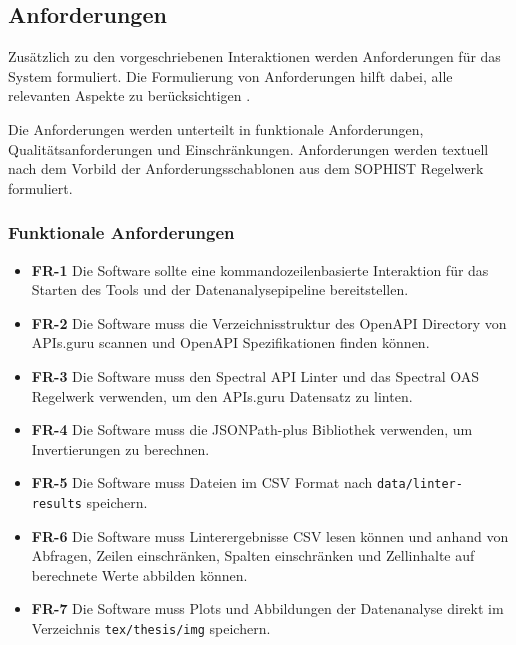\subsection{Anforderungen} \label{sec:anforderungen}
Zusätzlich zu den vorgeschriebenen Interaktionen werden Anforderungen für das System formuliert. Die Formulierung von Anforderungen hilft dabei, alle relevanten Aspekte zu berücksichtigen \parencite{bergsmann_requirements_2023}.

Die Anforderungen werden unterteilt in funktionale Anforderungen, Qualitätsanforderungen und Einschränkungen. Anforderungen werden textuell nach dem Vorbild der Anforderungsschablonen aus dem SOPHIST Regelwerk \parencite{rupp_requirements-engineering_2014} formuliert.


\subsubsection{Funktionale Anforderungen} \label{sec:funktionaleanforderungen}
\begin{itemize}
  \item \textbf{FR-1} Die Software sollte eine kommandozeilenbasierte Interaktion für das Starten des Tools und der Datenanalysepipeline bereitstellen.
  \item \textbf{FR-2} Die Software muss die Verzeichnisstruktur des OpenAPI Directory von APIs.guru scannen und OpenAPI Spezifikationen finden können.
  \item \textbf{FR-3} Die Software muss den Spectral \acs{API} Linter und das Spectral \acs{OAS} Regelwerk verwenden, um den APIs.guru Datensatz zu linten.
  \item \textbf{FR-4} Die Software muss die JSONPath-plus Bibliothek verwenden, um Invertierungen zu berechnen.
  \item \textbf{FR-5} Die Software muss Dateien im \acs{CSV} Format nach \texttt{data/linter-results} speichern.
  \item \textbf{FR-6} Die Software muss Linterergebnisse \acs{CSV} lesen können und anhand von Abfragen, Zeilen einschränken, Spalten einschränken und Zellinhalte auf berechnete Werte abbilden können.
  \item \textbf{FR-7} Die Software muss Plots und Abbildungen der Datenanalyse direkt im Verzeichnis \texttt{tex/thesis/img} speichern.
\end{itemize}


